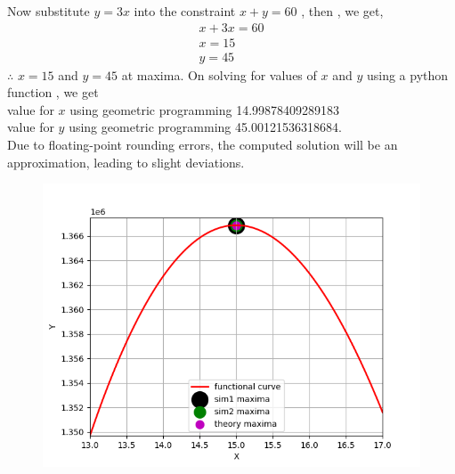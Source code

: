 \documentclass[journal]{IEEEtran}
\begin{document}
Now substitute $y = 3x$ into the constraint $x + y =60$ , then , we get,
\begin{align}
    x + 3x = 60\\
    x = 15\\
    y = 45
\end{align}
$\therefore$ $x = 15$ and $y = 45$ at maxima.
On solving for values of $x$ and $y$ using a python function , we get\\
value for $x$ using geometric programming 14.99878409289183\\
value for $y$ using geometric programming 45.00121536318684.\\
Due to floating-point rounding errors, the computed solution will be an approximation, leading to slight deviations.

\begin{figure}[h!]
   \centering
   \includegraphics[width=0.75\columnwidth]{figures/Figure_1.png}
   \label{graph of the function}
\end{figure}
\end{document}

